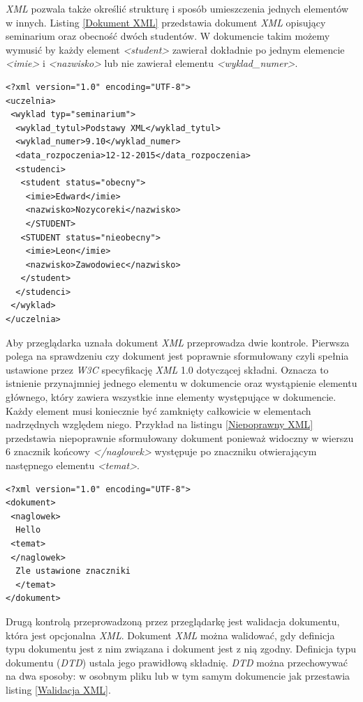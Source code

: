 \documentclass{iiuwb}
\begin{document}
\textit{XML} pozwala także określić strukturę i sposób umieszczenia jednych elementów w innych. 
Listing \ref{Dokument XML} przedstawia dokument \textit{XML} opisujący seminarium oraz obecność dwóch studentów. W dokumencie takim możemy wymusić by każdy element \textit{<student>} zawierał dokładnie po jednym elemencie \textit{<imie>} i \textit{<nazwisko>} lub nie zawierał elementu \textit{<wyklad\_numer>}.
\begin{lstlisting}[label=Dokument XML, caption=Przykładowy dokument XML]
<?xml version="1.0" encoding="UTF-8">
<uczelnia>
 <wyklad typ="seminarium">
  <wyklad_tytul>Podstawy XML</wyklad_tytul>	
  <wyklad_numer>9.10</wyklad_numer>
  <data_rozpoczenia>12-12-2015</data_rozpoczenia>
  <studenci>
   <student status="obecny">
    <imie>Edward</imie>
    <nazwisko>Nozycoreki</nazwisko>
    </STUDENT>
   <STUDENT status="nieobecny">
    <imie>Leon</imie>
    <nazwisko>Zawodowiec</nazwisko>
   </student>
  </studenci>
 </wyklad>
</uczelnia>
\end{lstlisting}

Aby przeglądarka uznała dokument \textit{XML} przeprowadza dwie kontrole. Pierwsza polega na sprawdzeniu czy dokument jest poprawnie sformułowany czyli spełnia ustawione przez \textit{W3C} specyfikację \textit{XML} 1.0 dotyczącej składni. Oznacza to istnienie przynajmniej jednego elementu w dokumencie oraz wystąpienie elementu głównego, który zawiera wszystkie inne elementy występujące w dokumencie. Każdy element musi koniecznie być zamknięty całkowicie w elementach nadrzędnych względem niego. Przykład na listingu  \ref{Niepoprawny XML} przedstawia niepoprawnie sformułowany dokument ponieważ widoczny w wierszu 6 znacznik końcowy \textit{</naglowek>} występuje po znaczniku otwierającym następnego elementu \textit{<temat>}.
\begin{lstlisting}[label=Niepoprawny XML, caption=Niepoprawnie sformułowany dokument XML]
<?xml version="1.0" encoding="UTF-8">
<dokument>
 <naglowek>
  Hello
 <temat>
 </naglowek>
  Zle ustawione znaczniki
  </temat>
</dokument>
\end{lstlisting}

Drugą kontrolą przeprowadzoną przez przeglądarkę jest walidacja dokumentu, która jest opcjonalna \textit{XML}. Dokument \textit{XML} można walidować, gdy definicja typu dokumentu jest z nim związana i dokument jest z nią zgodny. Definicja typu dokumentu (\textit{DTD}) ustala jego prawidłową składnię. \textit{DTD} można przechowywać na dwa sposoby: w osobnym pliku lub w tym samym dokumencie jak przestawia listing \ref{Walidacja XML}. 
\end{document}

